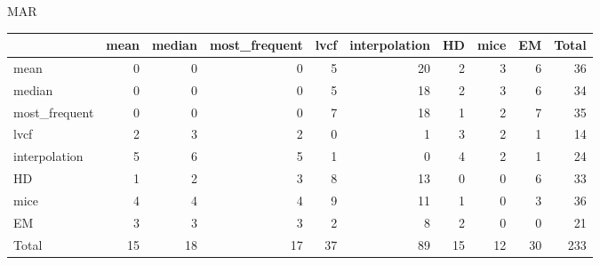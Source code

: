 \documentclass{article}
\begin{document}
\centering

{\large MAR}
\begin{tabular}{lrrrrrrrrr}
\hline
               &   mean &   median &   most\_frequent &   lvcf &   interpolation &   HD &   mice &   EM &   Total \\
\hline
 mean          &      0 &        0 &               0 &      5 &              20 &    2 &      3 &    6 &      36 \\
 median        &      0 &        0 &               0 &      5 &              18 &    2 &      3 &    6 &      34 \\
 most\_frequent &      0 &        0 &               0 &      7 &              18 &    1 &      2 &    7 &      35 \\
 lvcf          &      2 &        3 &               2 &      0 &               1 &    3 &      2 &    1 &      14 \\
 interpolation &      5 &        6 &               5 &      1 &               0 &    4 &      2 &    1 &      24 \\
 HD            &      1 &        2 &               3 &      8 &              13 &    0 &      0 &    6 &      33 \\
 mice          &      4 &        4 &               4 &      9 &              11 &    1 &      0 &    3 &      36 \\
 EM            &      3 &        3 &               3 &      2 &               8 &    2 &      0 &    0 &      21 \\
 Total         &     15 &       18 &              17 &     37 &              89 &   15 &     12 &   30 &     233 \\
\hline
\end{tabular}
\vspace{.5cm}

\centering
\end{document}
